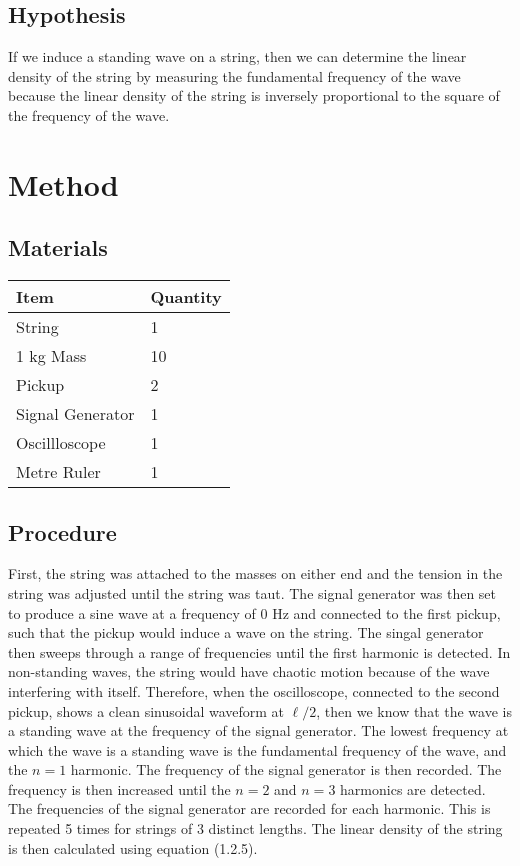 \documentclass[12pt, a4paper, english]{article}
\begin{document}
\subsection{Hypothesis}
If we induce a standing wave on a string, then we can determine the linear density of the string by measuring the fundamental frequency of the wave because the linear density of the string is inversely proportional to the square of the frequency of the wave.
\section{Method}
\subsection{Materials}
\begin{tabular}{ll}
    \textbf{Item} & \textbf{Quantity} \\
    \hline
    String & 1 \\
    1 kg Mass & 10 \\
    Pickup & 2 \\
    Signal Generator & 1 \\
    Oscillloscope & 1 \\
    Metre Ruler & 1 \\
\hline
\end{tabular}
\subsection{Procedure}
First, the string was attached to the masses on either end and the tension in the string was adjusted until the string was taut. The signal generator was then set to produce a sine wave at a frequency of 0 Hz and connected to the first pickup, such that the pickup would induce a wave on the string. The singal generator then sweeps through a range of frequencies until the first harmonic is detected. In non-standing waves, the string would have chaotic motion because of the wave interfering with itself. Therefore, when the oscilloscope, connected to the second pickup, shows a clean sinusoidal waveform at $\ell /2$, then we know that the wave is a standing wave at the frequency of the signal generator. The lowest frequency at which the wave is a standing wave is the fundamental frequency of the wave, and the $n=1$ harmonic. 
The frequency of the signal generator is then recorded. The frequency is then increased until the $n=2$ and $n=3$ harmonics are detected. The frequencies of the signal generator are recorded for each harmonic. This is repeated 5 times for strings of 3 distinct lengths. The linear density of the string is then calculated using equation (1.2.5).
\end{document}
